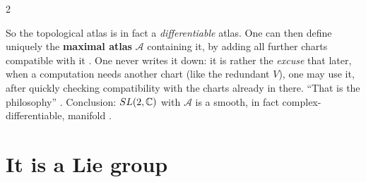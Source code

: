 \begin{paracol}{2}
\begin{coursenote}
\end{coursenote}
So the topological atlas is in fact a \emph{differentiable} atlas. One can then define uniquely the \textbf{maximal atlas} $\mathcal A$ containing it, by adding all further charts compatible with it  . One never writes it down: it is rather the \emph{excuse} that later, when a computation needs another chart (like the redundant $V$), one may use it, after quickly checking compatibility with the charts already in there. ``That is the philosophy''   . Conclusion: $SL(2,\mathbb{C})$ with $\mathcal A$ is a smooth, in fact complex-differentiable, manifold .

\section{It is a Lie group}\label{sec:sl-liegroup}


\end{paracol}
